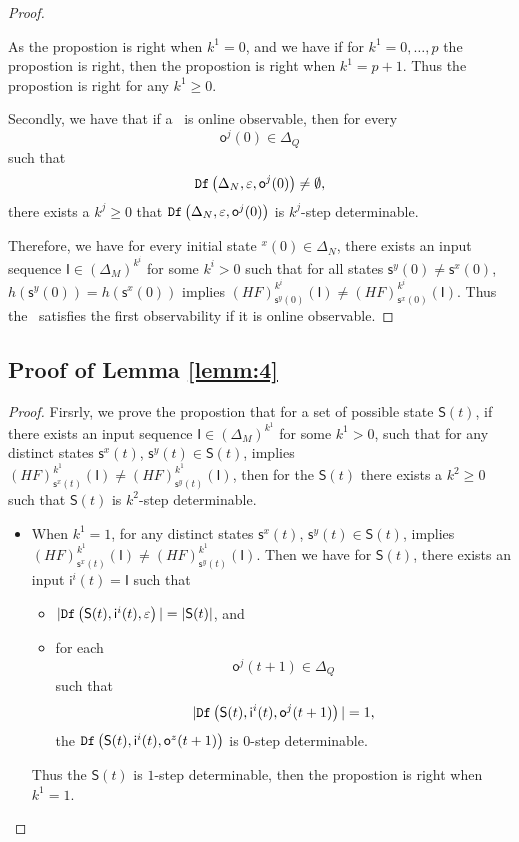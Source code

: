 \begin{appendices}
\begin{proof}
\begin{itemize}
\end{itemize}
As the propostion is right when $k^{1}=0$, and we have if for $k^{1}=0,\ldots, p$ the propostion is right, then the propostion is right when $k^{1}=p+1$. Thus the propostion is right for any $k^{1}\ge0$.

Secondly, we have that if a \BCN\ is online observable,
then for every  \[\mathsf{o}^{j}(0)\in \Delta_Q\] such that \[{\tt Df}\left(\Delta_N,\varepsilon, \mathsf{o}^{j}(0)\right)\ne \emptyset,\] there exists a $k^{j}\ge0$ that ${\tt Df}\left(\Delta_N,\varepsilon,\mathsf{o}^{j}(0)\right)$ is $k^{j}$-step determinable. 

Therefore, we have for every initial state \State$^{x}(0)$$\in \Delta_N$, there exists an input sequence $\mathsf{I}\in(\Delta_M)^{k^i}$ for some $k^i >0$ such that for all states $\mathsf{s}^{y}(0)\neq \mathsf{s}^{x}(0)$, $h(\mathsf{s}^{y}(0))=h(\mathsf{s}^{x}(0))$ implies $(HF)^{k^i}_{\mathsf{s}^{y}(0)}(\mathsf{I})\neq (HF)^{k^i}_{{\mathsf{s}^{x}(0)}}(\mathsf{I})$. Thus the \BCN\ satisfies the first observability if it is online observable.
\end{proof}

\subsection{Proof of Lemma \ref{lemm:4}}

\begin{proof}
Firsrly, we prove the propostion that for a set of possible state $\mathsf{S}(t)$, if there exists an input sequence $\mathsf{I}\in(\Delta_M)^{k^1}$ for some $k^1 >0$, such that for any distinct states $\mathsf{s}^{x}(t)$, $\mathsf{s}^{y}(t) \in \mathsf{S}(t)$, implies $(HF)^{k^1}_{\mathsf{s}^{x}(t)}(\mathsf{I})\neq (HF)^{k^1}_{\mathsf{s}^{y}(t)}(\mathsf{I})$, then for the $\mathsf{S}(t)$ there exists a $k^{2}\ge 0$ such that $\mathsf{S}(t)$ is $k^{2}$-step determinable.

\begin{itemize}
\item When $k^1=1$, for any distinct states $\mathsf{s}^{x}(t)$, $\mathsf{s}^{y}(t) \in \mathsf{S}(t)$, implies $(HF)^{k^1}_{\mathsf{s}^{x}(t)}(\mathsf{I})\neq (HF)^{k^1}_{\mathsf{s}^{y}(t)}(\mathsf{I})$. Then we have for $\mathsf{S}(t)$,
 there exists an input $\mathsf{i}^{i}(t)=\mathsf{I}$ such that
 \begin{itemize}
 \item  $|{\tt Df}\left(\mathsf{S}(t),\mathsf{i}^{i}(t),\varepsilon\right)|=|\mathsf{S}(t)|$, and 
 \item  for each \[\mathsf{o}^{j}(t+1)\in \Delta_Q\] such that \[|{\tt Df}\left(\mathsf{S}(t),\mathsf{i}^{i}(t),\mathsf{o}^{j}(t+1)\right)|=1,\] the ${\tt Df}\left(\mathsf{S}(t),\mathsf{i}^{i}(t),\mathsf{o}^{z}(t+1)\right)$ is $0$-step determinable.
 \end{itemize}
Thus the $\mathsf{S}(t)$ is $1$-step determinable, then the propostion is right when $k^1 =1$.


\end{itemize}
\end{proof}
\end{appendices}
